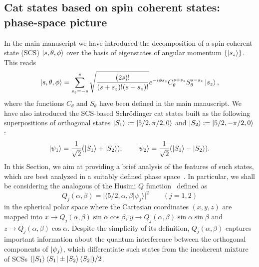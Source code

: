 \subsection{Cat states based on spin coherent states: phase-space picture}

In the main manuscript we have introduced the decomposition of a spin coherent state (SCS) $\ket{s,\theta,\phi}$ over the basis of eigenstates of angular momentum $\{\ket{s_z}\}$. This reads
\begin{equation}
\ket{s,\theta,\phi}=\sum^s_{s_z=-s}\sqrt{\frac{(2s)!}{(s+s_z)!(s-s_z)!}}e^{-i\phi s_z}C^{s+s_z}_\theta S^{s-s_z}_\theta\ket{s_z},
\end{equation}
where the functions $C_{\theta}$ and $S_\theta$ have been defined in the main manuscript. We have also introduced the SCS-based Schr{\"o}dinger cat states built as the following superpositions of orthogonal states $\ket{S_1}:=\ket{5/2,\pi/2,0}$ and $\ket{S_2}:=\ket{5/2,-\pi/2,0}$:
\begin{equation}
\ket{\psi_{1}}=\frac{1}{\sqrt 2}(\ket{S_1}+\ket{S_2}),\qquad\ket{\psi_{2}}=\frac{1}{\sqrt 2}(\ket{S_1}-\ket{S_2}).
\end{equation}
In this Section, we aim at providing a brief analysis of the features of such states, which are best analyzed in a suitably defined phase space~\cite{agarwalCAT1997}. In particular, we shall be considering the analogous of the Husimi $Q$ function~\cite{WM} defined as
\begin{equation}
\label{deco}
Q_j(\alpha,\beta)=\vert\langle{5/2,\alpha,\beta}\vert\psi_j\rangle\vert^2\qquad(j=1,2)
\end{equation}
in the spherical polar space where the Cartesian coordinates $(x,y,z)$ are mapped into $x\to Q_j(\alpha,\beta)\sin\alpha\cos\beta$, $y\to Q_j(\alpha,\beta)\sin\alpha\sin\beta$ and $z\to Q_j(\alpha,\beta)\cos\alpha$. Despite the simplicity of its definition, $Q_j(\alpha,\beta)$ captures important information about the quantum interference between the orthogonal components of $\ket{\psi_{j}}$, which differentiate such states from the incoherent mixture of SCSs $(\ket{S_1}\bra{S_1}\pm\ket{S_2}\bra{S_2})/2$. 

